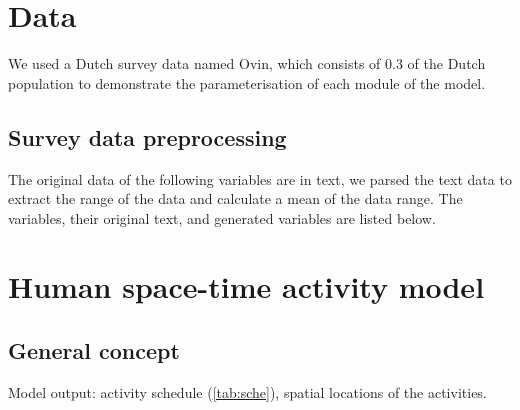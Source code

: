 \documentclass[]{article}
\begin{document}
\section{Data}
\label{sec:data} 
We used a Dutch survey data named Ovin, which consists of 0.3 of the Dutch population to demonstrate the parameterisation of each module of the model. 

\subsection{Survey data preprocessing}
The original data of the following variables are in text, we parsed the text data to extract the range of the data and calculate a mean of the data range. The variables, their original text, and generated variables are listed below.
 
\section{Human space-time activity model}
\label{sec:model}

\subsection{General concept}

Model output: activity schedule (\cref{tab:sche}), spatial locations of the activities.
\end{document}
